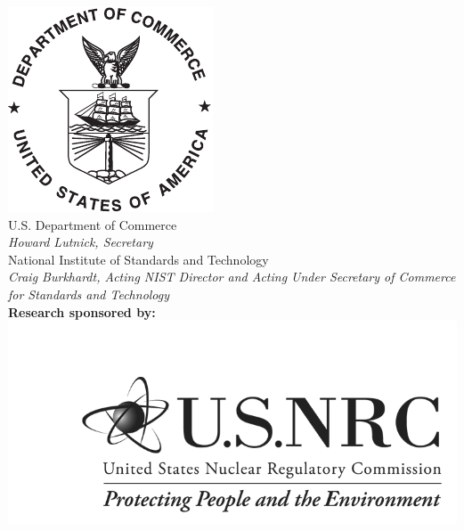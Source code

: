 \begin{titlepage}
\begin{flushright}
\includegraphics[width=0.2\linewidth]{../FIGURES/DoC-logo.pdf}\\
\vfill
\footnotesize U.S. Department of Commerce\\
\textit{Howard Lutnick, Secretary}\\
\vspace{10pt}
National Institute of Standards and Technology\\
\hspace*{-3cm}\textit{Craig Burkhardt, Acting NIST Director and Acting Under Secretary of Commerce for Standards and Technology} \\
\vspace{10pt}
\normalsize
\textbf{Research sponsored by:} \\
\includegraphics[width=0.4\linewidth]{../FIGURES/NRC_logo.png}
\end{flushright}
\end{titlepage}


